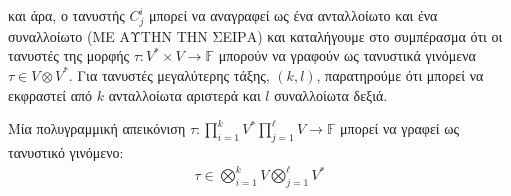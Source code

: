 \documentclass[main.tex]{subfiles}
\begin{document}
 	και άρα, ο τανυστής $C^i_j$ μπορεί να αναγραφεί ως ένα ανταλλοίωτο και ένα συναλλοίωτο (ΜΕ ΑΥΤΗΝ ΤΗΝ ΣΕΙΡΑ) και καταλήγουμε στο συμπέρασμα ότι οι τανυστές της μορφής ${\tau:V^*\times V \rightarrow\mathbb{F}}$ μπορούν να γραφούν ως τανυστικά γινόμενα $\tau \in V\otimes V^*$. Για τανυστές μεγαλύτερης τάξης, $(k,l)$, παρατηρούμε ότι μπορεί να εκφραστεί από $k$ ανταλλοίωτα αριστερά και $l$ συναλλοίωτα δεξιά.
 	\begin{corollary}
 		Μία πολυγραμμική απεικόνιση ${\tau:\prod_{i=1}^{k}V^*\prod_{j=1}^{\ell}V\rightarrow\mathbb{F}}$ μπορεί να γραφεί ως τανυστικό γινόμενο:
 		\begin{align*}
 			\tau \in \bigotimes_{i=1}^{k}V\bigotimes_{j=1}^{\ell}V^*
 		\end{align*}
 	\end{corollary}
 
\end{document}
